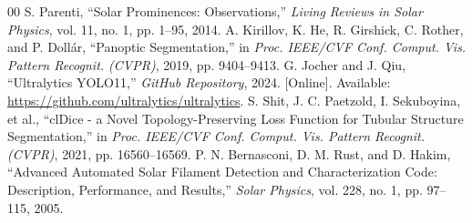 \documentclass[conference]{IEEEtran}
\begin{document}
\begin{thebibliography}{00}
 S. Parenti, ``Solar Prominences: Observations,'' \textit{Living Reviews in Solar Physics}, vol. 11, no. 1, pp. 1--95, 2014.
 A. Kirillov, K. He, R. Girshick, C. Rother, and P. Doll{\'a}r, ``Panoptic Segmentation,'' in \textit{Proc. IEEE/CVF Conf. Comput. Vis. Pattern Recognit. (CVPR)}, 2019, pp. 9404--9413.
 G. Jocher and J. Qiu, ``Ultralytics YOLO11,'' \textit{GitHub Repository}, 2024. [Online]. Available: \url{https://github.com/ultralytics/ultralytics}.
 S. Shit, J. C. Paetzold, I. Sekuboyina, et al., ``clDice - a Novel Topology-Preserving Loss Function for Tubular Structure Segmentation,'' in \textit{Proc. IEEE/CVF Conf. Comput. Vis. Pattern Recognit. (CVPR)}, 2021, pp. 16560--16569.
 P. N. Bernasconi, D. M. Rust, and D. Hakim, ``Advanced Automated Solar Filament Detection and Characterization Code: Description, Performance, and Results,'' \textit{Solar Physics}, vol. 228, no. 1, pp. 97--115, 2005.
\end{thebibliography}
\end{document}
